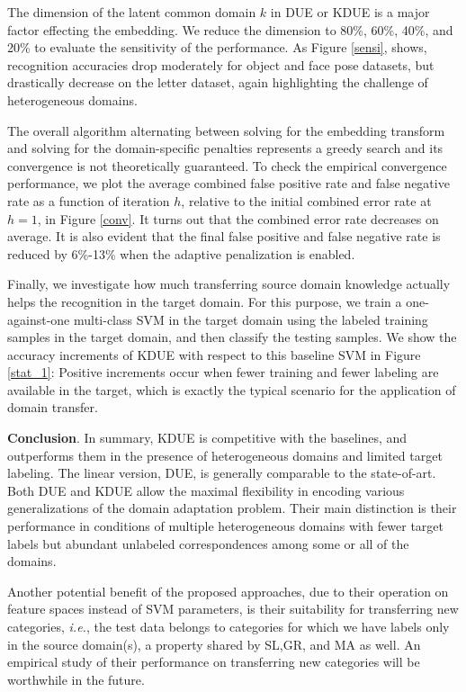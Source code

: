 \documentclass[10pt,twocolumn,letterpaper]{article}
\begin{document}
The dimension of the latent common domain $k$ in DUE or KDUE is a major factor effecting the embedding. We reduce the dimension to 80\%, 60\%, 40\%, and 20\% to evaluate the sensitivity of the performance. As Figure \ref{sensi}, shows, recognition accuracies drop moderately for object and face pose datasets, but drastically decrease on the letter dataset, again highlighting the challenge of heterogeneous domains.

The overall algorithm alternating between solving for the embedding transform and solving for the domain-specific penalties represents a greedy search and its convergence is not theoretically guaranteed. To check the empirical convergence performance, we plot the average combined false positive rate and false negative rate as a function of iteration $h$, relative to the initial combined error rate at $h=1$, in Figure \ref{conv}. It turns out that the combined error rate decreases on average.   It is also evident that the final false positive and false negative rate is reduced by 6\%-13\% when the adaptive penalization is enabled.

Finally, we investigate how much transferring source domain knowledge actually helps the recognition in the target domain. For this purpose, we train a one-against-one multi-class SVM in the target domain using the labeled training samples in the target domain, and then classify the testing samples. We show the accuracy increments of KDUE with respect to this baseline SVM in Figure \ref{stat_1}: Positive increments occur when fewer training and fewer labeling are available in the target, which is exactly the typical scenario for the application of domain transfer.



\noindent\textbf{Conclusion}. In summary, KDUE is competitive with the baselines, and outperforms them in the presence of heterogeneous domains and limited target labeling. The linear version, DUE, is generally comparable to the state-of-art. Both DUE and KDUE allow the maximal flexibility in encoding various generalizations of the domain adaptation problem. Their main distinction is their performance in conditions of multiple heterogeneous domains with fewer target labels but abundant unlabeled correspondences among some or all of the domains.

Another potential benefit of the proposed approaches, due to their operation on feature spaces instead of SVM parameters, is their suitability for transferring new categories, \textit{i.e.}, the test data belongs to categories for which we have labels only in the source domain(s), a property shared by SL,GR, and MA as well. An empirical study of their performance on transferring new categories will be worthwhile in the future.

{\footnotesize 


}
\end{document}
